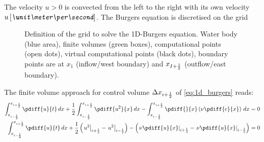The velocity $u>0$ is convected from the left to the right with its own velocity $u\, \bunit{\meter\per\second}$.
The Burgers equation is discretised on the grid
\begin{figure}[H]
    \centering
    \begin{center}
        \resizebox{0.8\textwidth}{!}{
            
        }
    \end{center}
    \caption[Definition of the grid to solve the 1D-Burgers equation]
    {Definition of the grid to solve the 1D-Burgers equation. \newline Water body (blue area), finite volumes (green boxes), computational points (open dots), 
    virtual computational points (black dots), boundary points are at $x_{1}$ (inflow/west boundary) and $x_{I+\frac{1}{2}}$ (outflow/east boundary).}\label{fig:water_body_fve_bc_at_node_1a}
\end{figure}
The finite volume approach for control volume $\Delta x_{i+\frac{1}{2}}$ of \autoref{eq:1d_burgers} reads:
\begin{align}
    \int^{x_{i+\half}}_{x_{i-\half}} \pdiff{u}{t}\, dx
    + \half\int^{x_{i+\half}}_{x_{i-\half}} \pdiff{u^2}{x} \, dx
    - \int^{x_{i+\half}}_{x_{i-\half}} \pdiff{}{x}\left( \nu\pdiff{c}{x} \right)\, dx &= 0
    \\
    \int^{x_{i+\half}}_{x_{i-\half}} \pdiff{u}{t}\, dx
    + \half \left( \left. u^2 \right|_{i+\half} - \left. u^2 \right|_{i-\half} \right)
    -  \left(
    \left. \nu\pdiff{u}{x}\right|_{i+\half} -
    \left. \nu\pdiff{u}{x}\right|_{i-\half}
    \right) & = 0
\end{align}
